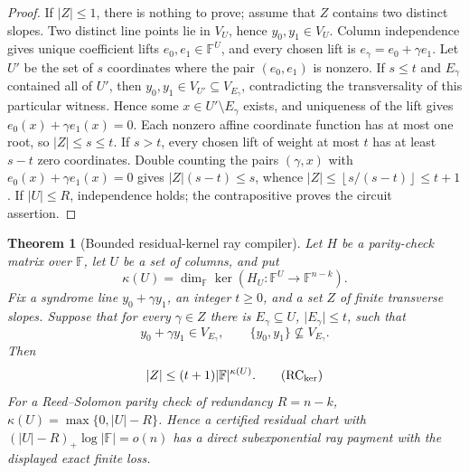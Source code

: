 \documentclass[11pt,a4paper]{amsart}
\numberwithin{equation}{section}
\newtheorem{theorem}{Theorem}[section]
\theoremstyle{remark}
\newcommand{\F}{\mathbb F}
\newcommand{\abs}[1]{\lvert #1\rvert}
\newcommand{\floor}[1]{\left\lfloor #1\right\rfloor}
\begin{document}
\begin{proof}
If \(\abs Z\le1\), there is nothing to prove; assume that \(Z\) contains
two distinct slopes.  Two distinct line points lie in \(V_U\), hence
\(y_0,y_1\in V_U\).
Column independence gives unique coefficient lifts
\(e_0,e_1\in\F^U\), and every chosen lift is
\(e_\gamma=e_0+\gamma e_1\).  Let \(U'\) be the set of \(s\) coordinates
where the pair \((e_0,e_1)\) is nonzero.  If \(s\le t\) and
\(E_\gamma\) contained all of \(U'\), then
\(y_0,y_1\in V_{U'}\subseteq V_{E_\gamma}\), contradicting the
transversality of this particular witness.  Hence some
\(x\in U'\setminus E_\gamma\) exists, and uniqueness of the lift gives
\(e_0(x)+\gamma e_1(x)=0\).  Each nonzero affine coordinate function has
at most one root, so \(\abs Z\le s\le t\).  If \(s>t\), every chosen lift of
weight at most \(t\) has at least \(s-t\) zero coordinates.  Double
counting the pairs \((\gamma,x)\) with
\(e_0(x)+\gamma e_1(x)=0\) gives
\(\abs Z(s-t)\le s\), whence
\(\abs Z\le\floor{s/(s-t)}\le t+1\).  If \(\abs U\le R\), independence
holds; the contrapositive proves the circuit assertion.
\end{proof}

\begin{theorem}[Bounded residual-kernel ray compiler]
\label{thm:bounded-residual-kernel-ray}
Let \(H\) be a parity-check matrix over \(\F\), let \(U\) be a set of
columns, and put
\[
 \kappa(U)=\dim_\F\ker(H_U:\F^U\longrightarrow\F^{n-k}).
\]
Fix a syndrome line \(y_0+\gamma y_1\), an integer \(t\ge0\), and a set
\(Z\) of finite transverse slopes.  Suppose that for every \(\gamma\in Z\)
there is \(E_\gamma\subseteq U\), \(\abs{E_\gamma}\le t\), such that
\[
 y_0+\gamma y_1\in V_{E_\gamma},\qquad
 \{y_0,y_1\}\not\subseteq V_{E_\gamma}.
\]
Then
\[
                  \abs Z\le(t+1)\abs{\F}^{\kappa(U)}. \tag{RC$_{\rm ker}$}
\]
For a Reed--Solomon parity check of redundancy \(R=n-k\),
\(\kappa(U)=\max\{0,\abs U-R\}\).  Hence a certified residual chart with
\((\abs U-R)_+\log\abs\F=o(n)\) has a direct subexponential ray payment
with the displayed exact finite loss.
\end{theorem}
\end{document}
